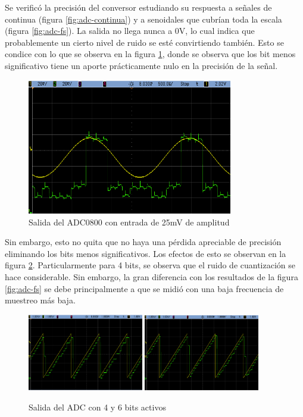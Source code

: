 \documentclass[assd_tp3_main.tex]{subfiles}
\begin{document}
Se verific\'o la precisi\'on del conversor estudiando su respuesta a se\~nales de continua (figura \ref{fig:adc-continua}) y a senoidales que cubr\'ian toda la escala (figura \ref{fig:adc-fs}). La salida no llega nunca a 0V, lo cual indica que probablemente un cierto nivel de ruido se est\'e convirtiendo tambi\'en. Esto se condice con lo que se observa en la figura \ref{fig:adc-chiquita}, donde se observa que los bit menos significativo tiene un aporte pr\'acticamente nulo en la precisi\'on de la se\~nal.


\begin{figure}[htb!]
	\centering
	\includegraphics[width=0.8\textwidth]
	{images/ej1/mediciones/a__.png}
	\caption{Salida del ADC0800 con entrada de 25mV de amplitud}
	\label{fig:adc-chiquita}
\end{figure}

Sin embargo, esto no quita que no haya una p\'erdida apreciable de precisi\'on eliminando los bits menos significativos. Los efectos de esto se observan en la figura \ref{fig:adc-bits}. Particularmente para 4 bits, se observa que el ruido de cuantizaci\'on se hace considerable. Sin embargo, la gran diferencia con los resultados de la figura \ref{fig:adc-fs} se debe principalmente a que se midi\'o con una baja frecuencia de muestreo m\'as baja.

\begin{figure}[htb!]
	\centering
	\includegraphics[width=0.45\textwidth]
	{images/ej1/mediciones/a_4.png}
	\includegraphics[width=0.45\textwidth]
	{images/ej1/mediciones/a_6.png}
	\caption{Salida del ADC con 4  y 6 bits activos}
	\label{fig:adc-bits}
\end{figure}
\end{document}
